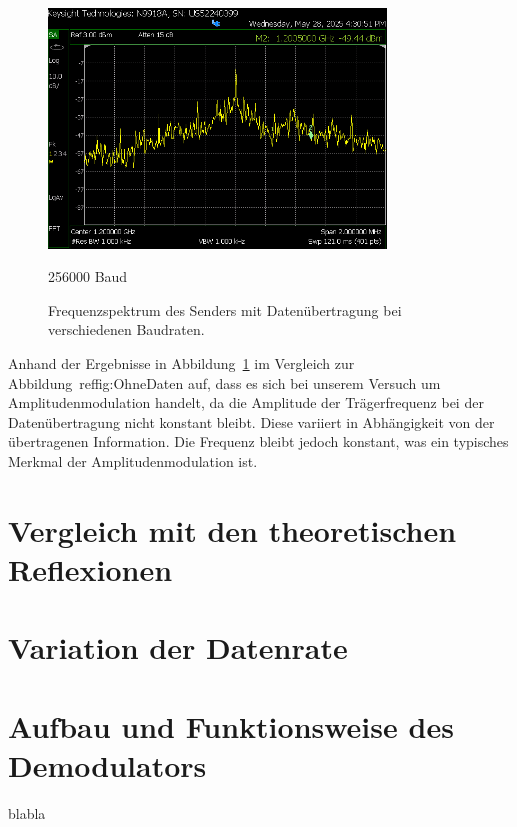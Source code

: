 \begin{figure}[H]
        \vspace{0.5cm}
        \begin{minipage}{0.1\textwidth}
        \end{minipage}
        \hfill
        \begin{minipage}{0.47\textwidth}
            \centering
            \includegraphics[width=0.8\textwidth]{Pictures/4.4C.256000.png}
            \caption*{256000 Baud}
        \end{minipage}
        \hfill
        \begin{minipage}{0.1\textwidth}
        \end{minipage}

        \caption{Frequenzspektrum des Senders mit Datenübertragung bei verschiedenen Baudraten.}
        \label{fig:MitDaten}
    \end{figure}

Anhand der Ergebnisse in Abbildung~\ref{fig:MitDaten} im Vergleich zur Abbildung~ref{fig:OhneDaten} auf, dass es sich bei unserem Versuch um Amplitudenmodulation handelt, da die Amplitude der Trägerfrequenz bei der Datenübertragung nicht konstant bleibt. Diese variiert in Abhängigkeit von der übertragenen Information. Die Frequenz bleibt jedoch konstant, was ein typisches Merkmal der Amplitudenmodulation ist.
\section{Vergleich mit den theoretischen Reflexionen}



\section{Variation der Datenrate}
\section{Aufbau und Funktionsweise des Demodulators}
blabla
\clearpage